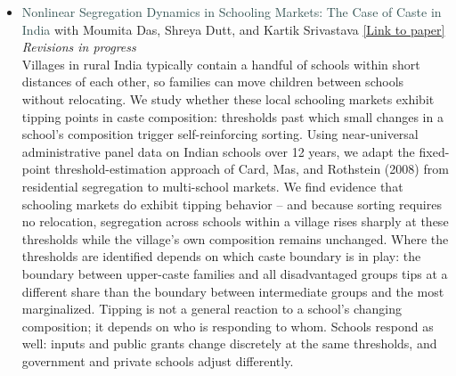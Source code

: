 \documentclass[letter,10pt]{article}
\begin{document}
\begin{itemize}
    \item[] \textcolor{darkslategray}{Nonlinear Segregation Dynamics in Schooling Markets: The Case of Caste in India} {\small{with Moumita Das, Shreya Dutt, and Kartik Srivastava}} \href{https://papers.ssrn.com/sol3/papers.cfm?abstract_id=6807040}{[Link to paper]}\\
    {\small{\textit{Revisions in progress}}}\\
    Villages in rural India typically contain a handful of schools within short distances of each other, so families can move children between schools without relocating. We study whether these local schooling markets exhibit tipping points in caste composition: thresholds past which small changes in a school's composition trigger self-reinforcing sorting. Using near-universal administrative panel data on Indian schools over 12 years, we adapt the fixed-point threshold-estimation approach of Card, Mas, and Rothstein (2008) from residential segregation to multi-school markets. We find evidence that schooling markets do exhibit tipping behavior -- and because sorting requires no relocation, segregation across schools within a village rises sharply at these thresholds while the village's own composition remains unchanged. Where the thresholds are identified depends on which caste boundary is in play: the boundary between upper-caste families and all disadvantaged groups tips at a different share than the boundary between intermediate groups and the most marginalized. Tipping is not a general reaction to a school's changing composition; it depends on who is responding to whom. Schools respond as well: inputs and public grants change discretely at the same thresholds, and government and private schools adjust differently.


\end{itemize}
\end{document}
